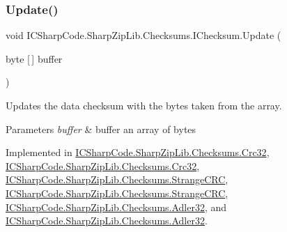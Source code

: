 \subsubsection{\texorpdfstring{Update()}{Update()}\hspace{0.1cm}{\footnotesize\ttfamily [4/6]}}
{\footnotesize\ttfamily void I\+C\+Sharp\+Code.\+Sharp\+Zip\+Lib.\+Checksums.\+I\+Checksum.\+Update (\begin{DoxyParamCaption}\item[{byte \mbox{[}$\,$\mbox{]}}]{buffer }\end{DoxyParamCaption})}



Updates the data checksum with the bytes taken from the array. 


\begin{DoxyParams}{Parameters}
{\em buffer} & buffer an array of bytes \\
\hline
\end{DoxyParams}


Implemented in \hyperlink{class_i_c_sharp_code_1_1_sharp_zip_lib_1_1_checksums_1_1_crc32_aed937de570263627f41641aea63e399f}{I\+C\+Sharp\+Code.\+Sharp\+Zip\+Lib.\+Checksums.\+Crc32}, \hyperlink{class_i_c_sharp_code_1_1_sharp_zip_lib_1_1_checksums_1_1_crc32_aed937de570263627f41641aea63e399f}{I\+C\+Sharp\+Code.\+Sharp\+Zip\+Lib.\+Checksums.\+Crc32}, \hyperlink{class_i_c_sharp_code_1_1_sharp_zip_lib_1_1_checksums_1_1_strange_c_r_c_aab01b02459d969f26576d15ac7cf3924}{I\+C\+Sharp\+Code.\+Sharp\+Zip\+Lib.\+Checksums.\+Strange\+C\+RC}, \hyperlink{class_i_c_sharp_code_1_1_sharp_zip_lib_1_1_checksums_1_1_strange_c_r_c_aab01b02459d969f26576d15ac7cf3924}{I\+C\+Sharp\+Code.\+Sharp\+Zip\+Lib.\+Checksums.\+Strange\+C\+RC}, \hyperlink{class_i_c_sharp_code_1_1_sharp_zip_lib_1_1_checksums_1_1_adler32_a37a55dd34c64e5b9ea40ef50a6e23afd}{I\+C\+Sharp\+Code.\+Sharp\+Zip\+Lib.\+Checksums.\+Adler32}, and \hyperlink{class_i_c_sharp_code_1_1_sharp_zip_lib_1_1_checksums_1_1_adler32_a37a55dd34c64e5b9ea40ef50a6e23afd}{I\+C\+Sharp\+Code.\+Sharp\+Zip\+Lib.\+Checksums.\+Adler32}.

\mbox{\label{interface_i_c_sharp_code_1_1_sharp_zip_lib_1_1_checksums_1_1_i_checksum_ae9f746b719a279125fd42e4d89f198dd}} 
